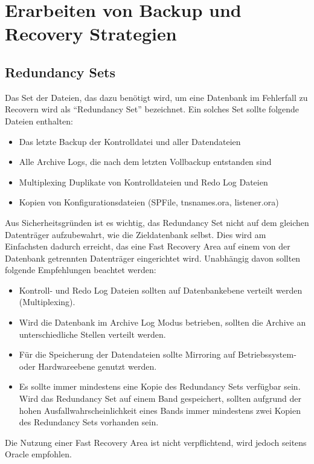     \section{Erarbeiten von Backup und Recovery Strategien}
      \subsection{Redundancy Sets}
        Das Set der Dateien, das dazu ben\"otigt wird, um eine Datenbank im Fehlerfall zu Recovern wird als \enquote{Redundancy Set} bezeichnet. Ein solches Set sollte folgende Dateien enthalten:
        \begin{itemize}
          \item Das letzte Backup der Kontrolldatei und aller Datendateien
          \item Alle Archive Logs, die nach dem letzten Vollbackup entstanden sind
          \item Multiplexing Duplikate von Kontrolldateien und Redo Log Dateien
          \item Kopien von Konfigurationsdateien (SPFile, tnsnames.ora, listener.ora)
        \end{itemize}
        Aus Sicherheitsgr\"unden ist es wichtig, das Redundancy Set nicht auf dem gleichen Datentr\"ager aufzubewahrt, wie die Zieldatenbank selbst. Dies wird am Einfachsten dadurch erreicht, das eine Fast Recovery Area auf einem von der Datenbank getrennten Datentr\"ager eingerichtet wird. Unabh\"angig davon sollten folgende Empfehlungen beachtet werden:
        \begin{itemize}
          \item Kontroll- und Redo Log Dateien sollten auf Datenbankebene verteilt werden (Multiplexing).
          \item Wird die Datenbank im Archive Log Modus betrieben, sollten die Archive an unterschiedliche Stellen verteilt werden.
          \item F\"ur die Speicherung der Datendateien sollte Mirroring auf Betriebssystem- oder Hardwareebene genutzt werden.
          \item Es sollte immer mindestens eine Kopie des Redundancy Sets verf\"ugbar sein. Wird das Redundancy Set auf einem Band gespeichert, sollten aufgrund der hohen Ausfallwahrscheinlichkeit eines Bands immer mindestens zwei Kopien des Redundancy Sets vorhanden sein.
        \end{itemize}
        Die Nutzung einer Fast Recovery Area ist nicht  verpflichtend, wird
        jedoch seitens Oracle empfohlen.
